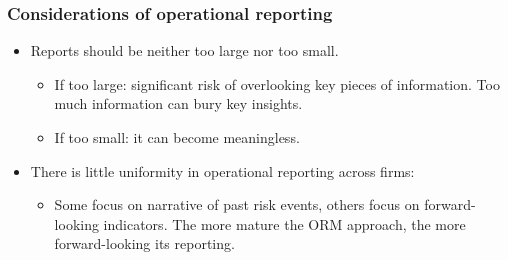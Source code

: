 \subsubsection{Considerations of operational reporting}
\begin{itemize}
\item Reports should be neither too large nor too small.
    \begin{itemize}
    \item If too large: significant risk of overlooking key pieces of information. Too much information can bury key insights.
    \item If too small: it can become meaningless.
    \end{itemize}
\item There is little uniformity in operational reporting across firms:
    \begin{itemize}
    \item Some focus on narrative of past risk events, others focus on forward-looking indicators. The more mature the ORM approach, the more forward-looking its reporting.
    \end{itemize}
\end{itemize}



